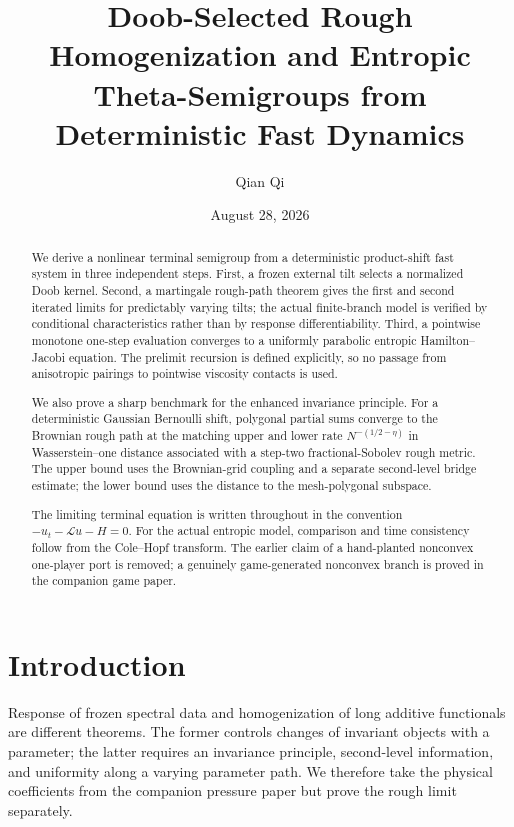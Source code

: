 \documentclass[11pt,reqno]{amsart}
\title[Doob-selected rough homogenization]{Doob-Selected Rough Homogenization and Entropic Theta-Semigroups from Deterministic Fast Dynamics}
\author{Qian Qi}
\date{August 28, 2026}
\theoremstyle{definition}
\theoremstyle{remark}
\begin{document}
\begin{abstract}
We derive a nonlinear terminal semigroup from a deterministic product-shift
fast system in three independent steps.  First, a frozen external tilt selects
a normalized Doob kernel.  Second, a martingale rough-path theorem gives the
first and second iterated limits for predictably varying tilts; the actual
finite-branch model is verified by conditional characteristics rather than by
response differentiability.  Third, a pointwise monotone one-step evaluation
converges to a uniformly parabolic entropic Hamilton--Jacobi equation.  The
prelimit recursion is defined explicitly, so no passage from anisotropic
pairings to pointwise viscosity contacts is used.

We also prove a sharp benchmark for the enhanced invariance principle.  For a
deterministic Gaussian Bernoulli shift, polygonal partial sums converge to the
Brownian rough path at the matching upper and lower rate
$N^{-(1/2-\eta)}$ in Wasserstein--one distance associated with a step-two
fractional-Sobolev rough metric.  The upper bound uses the Brownian-grid
coupling and a separate second-level bridge estimate; the lower bound uses the
distance to the mesh-polygonal subspace.

The limiting terminal equation is written throughout in the convention
$-u_t-\mathcal Lu-H=0$.  For the actual entropic model, comparison and time
consistency follow from the Cole--Hopf transform.  The earlier claim of a
hand-planted nonconvex one-player port is removed; a genuinely game-generated
nonconvex branch is proved in the companion game paper.
\end{abstract}

\maketitle
\tableofcontents

\section{Introduction}

Response of frozen spectral data and homogenization of long additive
functionals are different theorems.  The former controls changes of invariant
objects with a parameter; the latter requires an invariance principle,
second-level information, and uniformity along a varying parameter path.  We
therefore take the physical coefficients from the companion pressure paper but
prove the rough limit separately.
\end{document}
